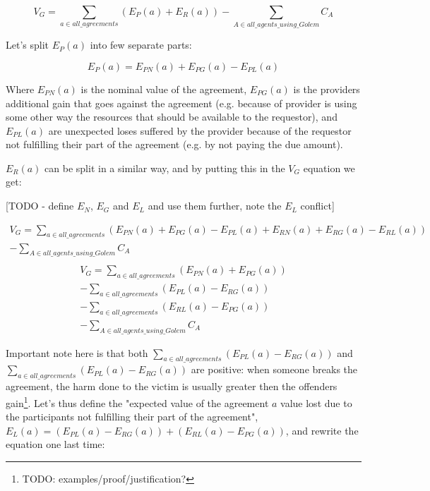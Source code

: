 \documentclass{article}
\begin{document}
\begin{equation}
    V_G = \sum_{a \in all\_agreements}(E_P(a) + E_R(a)) - \sum_{A \in all\_agents\_using\_Golem}C_A
\end{equation}

Let's split $E_P(a)$ into few separate parts:

\begin{equation}
    E_P(a) = E_{PN}(a) + E_{PG}(a) - E_{PL}(a)
\end{equation}

Where $E_{PN}(a)$ is the nominal value of the agreement, $E_{PG}(a)$ is the providers additional gain that goes against the agreement 
(e.g. because of provider is using some other way the resources that should be available to the requestor), and $E_{PL}(a)$ are unexpected loses 
suffered by the provider because of the requestor not fulfilling their part of the agreement (e.g. by not paying the due amount).

$E_R(a)$ can be split in a similar way, and by putting this in the $V_G$ equation we get:

[TODO - define $E_N$, $E_G$ and $E_L$ and use them further, note the $E_L$ conflict]

\begin{equation}
\begin{split}
    V_G = \sum_{a \in all\_agreements}(E_{PN}(a) + E_{PG}(a) - E_{PL}(a) + E_{RN}(a) + E_{RG}(a) - E_{RL}(a)) \\
            - \sum_{A \in all\_agents\_using\_Golem}C_A \\
\end{split}
\end{equation}
\begin{equation}
\begin{split}
    V_G = \sum_{a \in all\_agreements}(E_{PN}(a) + E_{PG}(a)) \\
          - \sum_{a \in all\_agreements}(E_{PL}(a)- E_{RG}(a)) \\
          - \sum_{a \in all\_agreements}(E_{RL}(a)- E_{PG}(a)) \\
          - \sum_{A \in all\_agents\_using\_Golem}C_A
\end{split}
\end{equation}

Important note here is that both $\sum_{a \in all\_agreements}(E_{PL}(a)- E_{RG}(a))$ and $\sum_{a \in all\_agreements}(E_{PL}(a)- E_{RG}(a))$ are positive: 
when someone breaks the agreement, the harm done to the victim is usually greater then the offenders gain\footnote{TODO: examples/proof/justification?}.
Let's thus define the "expected value of the agreement $a$ value lost due to the participants not fulfilling their part of the agreement", 
$E_L(a) = (E_{PL}(a)- E_{RG}(a)) + (E_{RL}(a)- E_{PG}(a))$, and rewrite the equation one last time:
\end{document}
